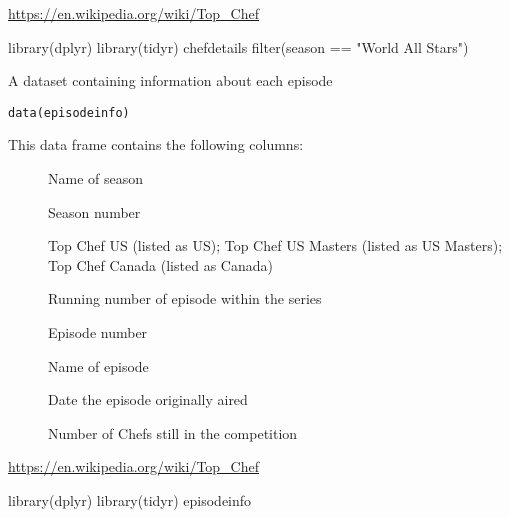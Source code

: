 \documentclass[a4paper]{book}
\begin{document}
%
\begin{Source}
\url{https://en.wikipedia.org/wiki/Top_Chef}
\end{Source}
%
\begin{Examples}
\begin{ExampleCode}
library(dplyr)
library(tidyr)
chefdetails %
  filter(season == "World All Stars")
\end{ExampleCode}
\end{Examples}
%
\begin{Description}
A dataset containing information about each episode
\end{Description}
%
\begin{Usage}
\begin{verbatim}
data(episodeinfo)
\end{verbatim}
\end{Usage}
%
\begin{Format}
This data frame contains the following columns:
\begin{description}

\item[] Name of season
\item[] Season number
\item[] Top Chef US (listed as US); Top Chef US Masters
(listed as US Masters); Top Chef Canada (listed as
Canada)
\item[] Running number of episode within
the series
\item[] Episode number
\item[] Name of episode
\item[] Date the episode originally aired
\item[] Number of Chefs still in the competition

\end{description}

\end{Format}
%
\begin{Source}
\url{https://en.wikipedia.org/wiki/Top_Chef}
\end{Source}
%
\begin{Examples}
\begin{ExampleCode}
library(dplyr)
library(tidyr)
episodeinfo %
\end{ExampleCode}
\end{Examples}
\end{document}
